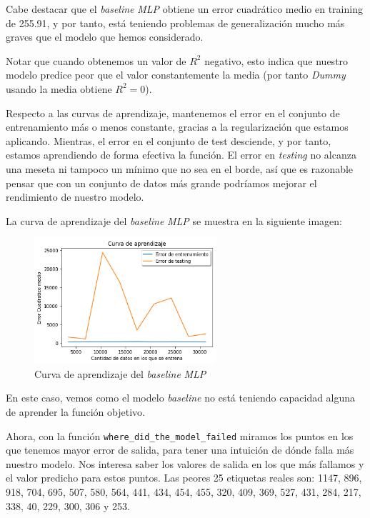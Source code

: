 \documentclass[11pt]{article}
\begin{document}
Cabe destacar que el \emph{baseline} \emph{MLP} obtiene un error cuadrático medio en training de 255.91, y por tanto, está teniendo problemas de generalización mucho más graves que el modelo que hemos considerado.

Notar que cuando obtenemos un valor de $R^2$ negativo, esto indica que nuestro modelo predice peor que el valor constantemente la media (por tanto \emph{Dummy} usando la media obtiene $R^2 = 0$).

Respecto a las curvas de aprendizaje, mantenemos el error en el conjunto de entrenamiento más o menos constante, gracias a la regularización que estamos aplicando. Mientras, el error en el conjunto de test desciende, y por tanto, estamos aprendiendo de forma efectiva la función. El error en \emph{testing} no alcanza una meseta ni tampoco un mínimo que no sea en el borde, así que es razonable pensar que con un conjunto de datos más grande podríamos mejorar el rendimiento de nuestro modelo.

La curva de aprendizaje del \emph{baseline} \emph{MLP} se muestra en la siguiente imagen:

\begin{figure}[H]
  \centering
  \includegraphics[width=0.6\textwidth]{curva_aprendizaje_mlp}
  \caption{Curva de aprendizaje del \emph{baseline} \emph{MLP}}
\end{figure}

En este caso, vemos como el modelo \emph{baseline} no está teniendo capacidad alguna de aprender la función objetivo.

Ahora, con la función \lstinline{where_did_the_model_failed} miramos los puntos en los que tenemos mayor error de salida, para tener una intuición de dónde falla más nuestro modelo. Nos interesa saber los valores de salida en los que más fallamos y el valor predicho para estos puntos. Las peores 25 etiquetas reales son: 1147,  896,  918,  704,  695,  507,  580,  564,  441,  434,  454,  455,  320,  409,   369,  527,  431,  284,  217,  338,   40,  229,  300,  306 y 253.
\end{document}
